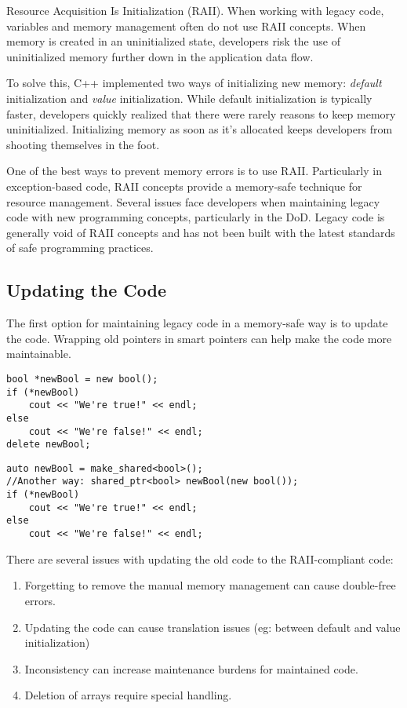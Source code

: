 Resource Acquisition Is Initialization (RAII). When working with legacy code, variables and memory management often do not use RAII concepts. When memory is created in an uninitialized state, developers risk the use of uninitialized memory further down in the application data flow.

To solve this, C++ implemented two ways of initializing new memory: \textit{default} initialization and \textit{value} initialization. While default initialization is typically faster, developers quickly realized that there were rarely reasons to keep memory uninitialized. Initializing memory as soon as it's allocated keeps developers from shooting themselves in the foot.

One of the best ways to prevent memory errors is to use RAII. Particularly in exception-based code, RAII concepts provide a memory-safe technique for resource management.\autocite{20210412:stroustrup2001} Several issues face developers when maintaining legacy code with new programming concepts, particularly in the DoD. Legacy code is generally void of RAII concepts and has not been built with the latest standards of safe programming practices.

\subsection{Updating the Code}

The first option for maintaining legacy code in a memory-safe way is to update the code. Wrapping old pointers in smart pointers can help make the code more maintainable.

\begin{lstlisting}[caption={Non-compliant listing},captionpos=b,style=CStyle,basicstyle=\small]
bool *newBool = new bool();
if (*newBool)
	cout << "We're true!" << endl;
else
	cout << "We're false!" << endl;
delete newBool;
\end{lstlisting}

\begin{lstlisting}[caption={RAII-compliant listing},captionpos=b,style=CStyle,basicstyle=\small]
auto newBool = make_shared<bool>();
//Another way: shared_ptr<bool> newBool(new bool());
if (*newBool)
	cout << "We're true!" << endl;
else
	cout << "We're false!" << endl;
\end{lstlisting}

There are several issues with updating the old code to the RAII-compliant code:
\begin{enumerate}
	\item Forgetting to remove the manual memory management can cause double-free errors.
	\item Updating the code can cause translation issues (eg: between default and value initialization)
	\item Inconsistency can increase maintenance burdens for maintained code.
	\item Deletion of arrays require special handling.
\end{enumerate}

